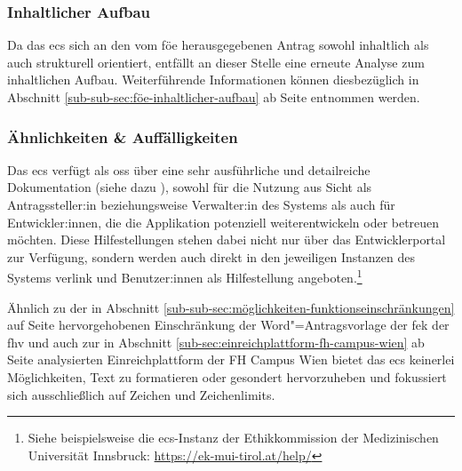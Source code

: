 \documentclass[a4paper,12pt,twoside]{scrreprt}
\begin{document}
\subsubsection*{Inhaltlicher Aufbau}
\label{sub-sub-sec:ecs-inhaltlicher-aufbau}

Da das \ac{ecs} sich an den vom \acl{föe} herausgegebenen Antrag sowohl inhaltlich als auch strukturell orientiert, entfällt an dieser Stelle eine erneute Analyse zum inhaltlichen Aufbau. Weiterführende Informationen können diesbezüglich in Abschnitt \ref{sub-sub-sec:föe-inhaltlicher-aufbau} ab Seite \pageref{sub-sub-sec:föe-inhaltlicher-aufbau} entnommen werden.

\subsubsection*{Ähnlichkeiten \& Auffälligkeiten}
\label{sub-sub-sec:ähnlichkeiten-auffälligkeiten-ecs}

Das \acl{ecs} verfügt als \ac{oss} über eine sehr ausführliche und detailreiche Dokumentation (siehe dazu \cite{medizinische_universitat_wien_ecs_2021-1, medizinische_universitat_wien_development_2021, medizinische_universitat_wien_installationusage_2021, medizinische_universitat_wien_ecs_2021, ethics_commission_system_organization_ecs_2021}), sowohl für die Nutzung aus Sicht als Antragssteller:in beziehungsweise Verwalter:in des Systems als auch für Entwickler:innen, die die Applikation potenziell weiterentwickeln oder betreuen möchten. Diese Hilfestellungen stehen dabei nicht nur über das Entwicklerportal zur Verfügung, sondern werden auch direkt in den jeweiligen Instanzen des Systems verlink und Benutzer:innen als Hilfestellung angeboten.\footnote{Siehe beispielsweise die \ac{ecs}-Instanz der Ethikkommission der Medizinischen Universität Innsbruck: \url{https://ek-mui-tirol.at/help/}}

\medskip

Ähnlich zu der in Abschnitt \ref{sub-sub-sec:möglichkeiten-funktionseinschränkungen} auf Seite \pageref{sub-sub-sec:möglichkeiten-funktionseinschränkungen} hervorgehobenen Einschränkung der Word"=Antragsvorlage der \ac{fek} der \ac{fhv} und auch zur in Abschnitt \ref{sub-sec:einreichplattform-fh-campus-wien} ab Seite \pageref{sub-sec:einreichplattform-fh-campus-wien} analysierten Einreichplattform der FH Campus Wien bietet das \acl{ecs} keinerlei Möglichkeiten, Text zu formatieren oder gesondert hervorzuheben und fokussiert sich ausschließlich auf Zeichen und Zeichenlimits.
\end{document}
